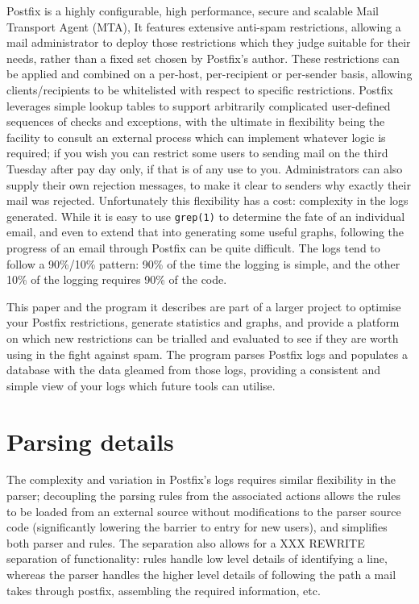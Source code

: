 \documentclass[a4paper,12pt,draft]{article}
\begin{document}
Postfix is a highly configurable, high performance, secure and scalable
Mail Transport Agent (MTA),  It features extensive anti-spam restrictions,
allowing a mail administrator to deploy those restrictions which they judge
suitable for their needs, rather than a fixed set chosen by Postfix's
author.  These restrictions can be applied and combined on a per-host,
per-recipient or per-sender basis, allowing clients/recipients to be
whitelisted with respect to specific restrictions.  Postfix leverages
simple lookup tables to support arbitrarily complicated user-defined
sequences of checks and exceptions, with the ultimate in flexibility being
the facility to consult an external process which can implement whatever
logic is required; if you wish you can restrict some users to sending mail
on the third Tuesday after pay day only, if that is of any use to you.
Administrators can also supply their own rejection messages, to make it
clear to senders why exactly their mail was rejected.  Unfortunately this
flexibility has a cost: complexity in the logs generated.  While it is easy
to use \texttt{grep(1)} to determine the fate of an individual email, and
even to extend that into generating some useful graphs, following the
progress of an email through Postfix can be quite difficult.  The logs tend
to follow a 90\%/10\% pattern: 90\% of the time the logging is simple, and
the other 10\% of the logging requires 90\% of the code.

This paper and the program it describes are part of a larger project to
optimise your Postfix restrictions, generate statistics and graphs, and
provide a platform on which new restrictions can be trialled and evaluated
to see if they are worth using in the fight against spam.  The program
parses Postfix logs and populates a database with the data gleamed from
those logs, providing a consistent and simple view of your logs which
future tools can utilise.  


\section{Parsing details}

The complexity and variation in Postfix's logs requires similar flexibility
in the parser; decoupling the parsing rules from the associated actions
allows the rules to be loaded from an external source without modifications
to the parser source code (significantly lowering the barrier to entry for
new users), and simplifies both parser and rules.  The separation also
allows for a XXX REWRITE separation of functionality: rules handle low
level details of identifying a line, whereas the parser handles the higher
level details of following the path a mail takes through postfix,
assembling the required information, etc.
\end{document}
